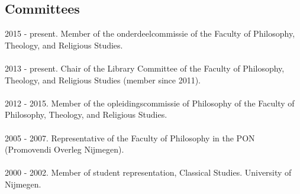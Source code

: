 \documentclass[a4paper,11pt]{article}
\begin{document}
\subsection*{Committees}
2015 - present. Member of the onderdeelcommissie of the Faculty of Philosophy, Theology, and Religious Studies.\\\\
2013 - present. Chair of the Library Committee of the Faculty of Philosophy, Theology, and Religious Studies (member since 2011).\\\\
2012 - 2015. Member of the opleidingscommissie of Philosophy of the Faculty of Philosophy, Theology, and Religious Studies.\\\\
 2005 -  2007. Representative of the Faculty of
Philosophy in the PON (Promovendi Overleg Nijmegen).\\\\
2000 - 2002. Member of student representation, Classical Studies. University of Nijmegen.\\\\
\end{document}
